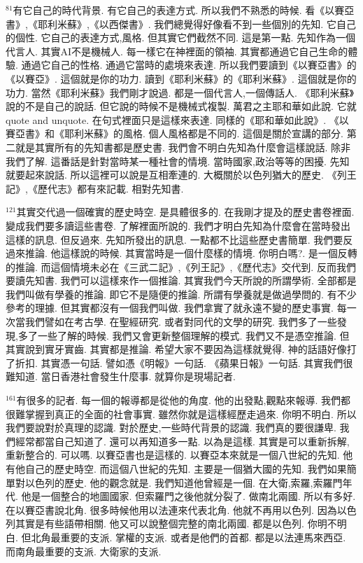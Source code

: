\documentclass{book}
\begin{document}
$^{81}$有它自己的時代背景.
有它自己的表達方式.
所以我們不熟悉的時候.
看《以賽亞書》,《耶利米蘇》,《以西傑書》.
我們總覺得好像看不到一些個別的先知.
它自己的個性.
它自己的表達方式,風格.
但其實它們截然不同.
這是第一點.
先知作為一個代言人.
其實AI不是機械人.
每一樣它在神裡面的領袖.
其實都通過它自己生命的體驗.
通過它自己的性格.
通過它當時的處境來表達.
所以我們要讀到《以賽亞書》的《以賽亞》.
這個就是你的功力.
讀到《耶利米蘇》的《耶利米蘇》.
這個就是你的功力.
當然《耶利米蘇》我們剛才說過.
都是一個代言人,一個傳話人.
《耶利米蘇》說的不是自己的說話.
但它說的時候不是機械式複製.
萬君之主耶和華如此說.
它就quote and unquote.
在句式裡面只是這樣來表達.
同樣的《耶和華如此說》.
《以賽亞書》和《耶利米蘇》的風格.
個人風格都是不同的.
這個是關於宣講的部分.
第二就是其實所有的先知書都是歷史書.
我們會不明白先知為什麼會這樣說話.
除非我們了解.
這番話是針對當時某一種社會的情境.
當時國家,政治等等的困擾.
先知就要起來說話.
所以這裡可以說是互相牽連的.
大概關於以色列猶大的歷史.
《列王記》,《歷代志》都有來記載.
相對先知書.

$^{121}$其實交代過一個確實的歷史時空.
是具體很多的.
在我剛才提及的歷史書卷裡面.
變成我們要多讀這些書卷.
了解裡面所說的.
我們才明白先知為什麼會在當時發出這樣的訊息.
但反過來.
先知所發出的訊息.
一點都不比這些歷史書簡單.
我們要反過來推論.
他這樣說的時候.
其實當時是一個什麼樣的情境.
你明白嗎?.
是一個反轉的推論.
而這個情境未必在《三武二記》,《列王記》,《歷代志》交代到.
反而我們要讀先知書.
我們可以這樣來作一個推論.
其實我們今天所說的所謂學術.
全部都是我們叫做有學養的推論.
即它不是隨便的推論.
所謂有學養就是做過學問的.
有不少參考的理據.
但其實都沒有一個我們叫做.
我們拿實了就永遠不變的歷史事實.
每一次當我們譬如在考古學.
在聖經研究.
或者對同代的文學的研究.
我們多了一些發現,多了一些了解的時候.
我們又會更新整個理解的模式.
我們又不是憑空推論.
但其實說到實牙實齒.
其實都是推論.
希望大家不要因為這樣就覺得.
神的話語好像打了折扣.
其實憑一句話.
譬如憑《明報》一句話.
《蘋果日報》一句話.
其實我們很難知道.
當日香港社會發生什麼事.
就算你是現場記者.

$^{161}$有很多的記者.
每一個的報導都是從他的角度.
他的出發點,觀點來報導.
我們都很難掌握到真正的全面的社會事實.
雖然你就是這樣經歷走過來.
你明不明白.
所以我們要說對於真理的認識.
對於歷史,一些時代背景的認識.
我們真的要很謙卑.
我們經常都當自己知道了.
還可以再知道多一點.
以為是這樣.
其實是可以重新拆解,重新整合的.
可以嗎.
以賽亞書也是這樣的.
以賽亞本來就是一個八世紀的先知.
他有他自己的歷史時空.
而這個八世紀的先知.
主要是一個猶大國的先知.
我們如果簡單對以色列的歷史.
他的觀念就是.
我們知道他曾經是一個.
在大衛,索羅,索羅門年代.
他是一個整合的地圖國家.
但索羅門之後他就分裂了.
做南北兩國.
所以有多好.
在以賽亞書說北角.
很多時候他用以法連來代表北角.
他就不再用以色列.
因為以色列其實是有些語帶相關.
他又可以說整個完整的南北兩國.
都是以色列.
你明不明白.
但北角最重要的支派.
掌權的支派.
或者是他們的首都.
都是以法連馬來西亞.
而南角最重要的支派.
大衛家的支派.
\end{document}
